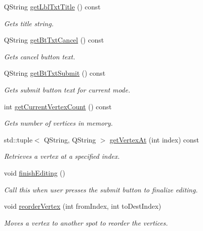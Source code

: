 \begin{DoxyCompactItemize}
Q\+String \mbox{\hyperlink{class_v_m_editor_vertices_acd45db915cce57f22aef0fa5869c78b8}{get\+Lbl\+Txt\+Title}} () const
\begin{DoxyCompactList}\small\item\em Gets title string. \end{DoxyCompactList}\item 
Q\+String \mbox{\hyperlink{class_v_m_editor_vertices_a0db2a882a7334d63902bbb5e93745efe}{get\+Bt\+Txt\+Cancel}} () const
\begin{DoxyCompactList}\small\item\em Gets cancel button text. \end{DoxyCompactList}\item 
Q\+String \mbox{\hyperlink{class_v_m_editor_vertices_added9bc98a3854b9639ea4f1e4c58e25}{get\+Bt\+Txt\+Submit}} () const
\begin{DoxyCompactList}\small\item\em Gets submit button text for current mode. \end{DoxyCompactList}\item 
int \mbox{\hyperlink{class_v_m_editor_vertices_ac126c0b810f29c803f54cea4a50b6953}{get\+Current\+Vertex\+Count}} () const
\begin{DoxyCompactList}\small\item\em Gets number of vertices in memory. \end{DoxyCompactList}\item 
std\+::tuple$<$ Q\+String, Q\+String $>$ \mbox{\hyperlink{class_v_m_editor_vertices_a1fce7e9467a432c63700f889ab8d6d59}{get\+Vertex\+At}} (int index) const
\begin{DoxyCompactList}\small\item\em Retrieves a vertex at a specified index. \end{DoxyCompactList}\item 
void \mbox{\hyperlink{class_v_m_editor_vertices_a3dafad61c61cfd7b90d2e1651daa79be}{finish\+Editing}} ()
\begin{DoxyCompactList}\small\item\em Call this when user presses the submit button to finalize editing. \end{DoxyCompactList}\item 
void \mbox{\hyperlink{class_v_m_editor_vertices_a33f91a61158bbac2b540ca80ac75eaf1}{reorder\+Vertex}} (int from\+Index, int to\+Dest\+Index)
\begin{DoxyCompactList}\small\item\em Moves a vertex to another spot to reorder the vertices. \end{DoxyCompactList}\item 

\end{DoxyCompactItemize}
